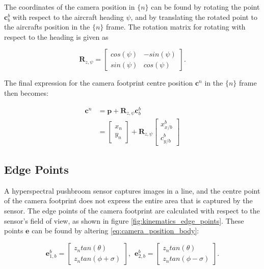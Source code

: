 The coordinates of the camera position in $\{n\}$ can be found by rotating the point $\mathbf{c}_b^b$ with respect to the aircraft heading $\psi$, and by translating the rotated point to the aircrafts position in the $\{n\}$ frame. The rotation matrix for rotating with respect to the heading is given as

\begin{equation}
	\mathbf{R}_{z,\psi} =
	\begin{bmatrix}
		cos(\psi) & -sin(\psi) \\
		sin(\psi) & cos(\psi)
	\end{bmatrix}.
\end{equation}

The final expression for the camera footprint centre position $\mathbf{c}^n$ in the $\{n\}$ frame then becomes:

\begin{equation}
\label{eq:camera_position_ned}
\begin{split}
	\mathbf{c}^n & = \mathbf{p} + \mathbf{R}_{z,\psi} \mathbf{c}_b^b \\
	& =
	\begin{bmatrix}
		x_n \\ y_n
	\end{bmatrix}
	+ \mathbf{R}_{z,\psi}
	\begin{bmatrix}
		x_{x/b}^b \\ c_{y/b}^b
	\end{bmatrix}
\end{split}
\end{equation}


\subsection{Edge Points}

A hyperspectral pushbroom sensor captures images in a line, and the centre point of the camera footprint does not express the entire area that is captured by the sensor. The edge points of the camera footprint are calculated with respect to the sensor's field of view, as shown in figure \ref{fig:kinematics_edge_points}. These points $\mathbf{e}$ can be found by altering \ref{eq:camera_position_body}:

\begin{equation}
	\mathbf{e}_{1,b}^b =
	\begin{bmatrix}
		z_n tan(\theta) \\ z_n tan(\phi + \sigma)
	\end{bmatrix}
	, \hspace{5pt}
	\mathbf{e}_{2,b}^b =
	\begin{bmatrix}
		z_n tan(\theta) \\ z_n tan(\phi - \sigma)
	\end{bmatrix}.
\end{equation}

